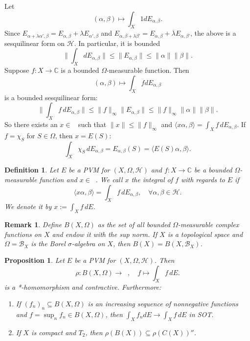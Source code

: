 \documentclass[10pt, a4paper]{article}
\newtheorem{proposition}[thm]{Proposition}
\newtheorem{defi}[thm]{Definition}
\newenvironment{noticeB}{%
  \tcolorbox[%
  notitle,
  empty,
  enhanced,  %
  breakable,
  coltext=black,
  colback=white, 
  fontupper=\rmfamily,
  noparskip,
  sharp corners,
  boxrule=-1pt,  %
  frame hidden,
  left=7pt,  %
  right=7pt,
  top=5pt,
  bottom=5pt,
  before skip=2.5ex plus 2pt,
  after skip=2.5ex plus 2pt,
  borderline west = {1.5pt}{-0.1pt}{blue!30!black}, %
  overlay unbroken and last={%
    \draw[color=black, line width=1.25pt]
    ($(frame.south west)+(1.pt, -0.1pt)$) -- ++(2em, 0);
  }
  ]}
{\endtcolorbox}
\newenvironment{definition}{\begin{noticeB}\begin{defi}}{%
    \end{defi}\end{noticeB}}
\newtheorem*{remark}{Remark}
\newcommand{\C}{\mathbb {C}}
\DeclareMathOperator{\bh}{\mathcal{B} (\mathcal{H})}
\begin{document}
Let $$(\alpha, \beta) \mapsto \int_X 1 dE_{\alpha, \beta}.$$ Since 
$E_{\alpha + \lambda \alpha', \beta} = E_{\alpha, \beta} + \lambda E_{\alpha', \beta}$ and
$E_{\alpha, \beta + \lambda \beta'} = E_{\alpha, \beta} + \overline{\lambda} E_{\alpha, \beta'}$,
the above is a sesquilinear form on $\mathcal{H}$. In particular, it is bounded
$$\| \int_X dE_{\alpha, \beta}\| \leq \| E_{\alpha, \beta}\| \leq \|\alpha\| \|\beta\|.$$
Suppose $f: X \to \C$ is a bounded $\Omega$-measurable function. Then 
$$(\alpha, \beta) \mapsto \int_X f dE_{\alpha, \beta}$$
is a bounded sesquilinear form:
$$\| \int_X f\, dE_{\alpha, \beta}\| \leq \|f\|_{\infty} \| E_{\alpha, \beta}\| \leq \|f\|_{\infty} \|\alpha\| \|\beta\|.$$
So there exists an $x \in \bh$ such that $\| x\| \leq \| f\|_\infty$ and 
$\langle x \alpha, \beta \rangle = \int_X f\, dE_{\alpha, \beta}$.
If $f = \chi_S$ for $S \in \Omega$, then $x = E(S)$:
$$\int_X \chi_S\, dE_{\alpha, \beta} = E_{\alpha, \beta} (S) = \langle E(S) \alpha, \beta \rangle.$$

\begin{definition}
  Let $E$ be a PVM for $(X, \Omega, \mathcal{H})$ and $f: X \to \C$ be a bounded $\Omega$-measurable 
  function and $x \in \bh$. We call $x$ the integral of $f$ with regards to $E$ if 
  $$\langle x\alpha, \beta \rangle = \int_X f\, dE_{\alpha, \beta},\quad \forall \alpha, \beta \in \mathcal{H}.$$
  We denote it by $x := \int_X f\, dE$.
\end{definition}

\begin{remark}
  Define $B(X, \Omega)$ as the set of all bounded $\Omega$-measurable complex functions on $X$ and endow it with the sup norm.
  If $X$ is a topological space and $\Omega = \mathcal{B}_X$ is the Borel $\sigma$-algebra on $X$,
  then $B(X) = B(X, \mathcal{B}_X)$.
\end{remark}

\begin{proposition}
  Let $E$ be a PVM for $(X, \Omega, \mathcal{H})$. Then 
  $$\rho: B(X, \Omega) \to \bh,\quad f \mapsto \int_X f\, dE.$$
  is a *-homomorphism and contractive. Furthermore:
  \begin{enumerate}
    \item If $(f_n)_n \subseteq B (X, \Omega)$ is an increasing sequence of nonnegative functions 
    and $f = \sup_n f_n \in B (X, \Omega)$, then $\int_X f_n dE \to \int_X f\, dE$ in SOT.
    \item If $X$ is compact and $T_2$, then $\rho (B (X)) \subseteq \rho (C(X))''$.
  \end{enumerate}
\end{proposition}
\end{document}
